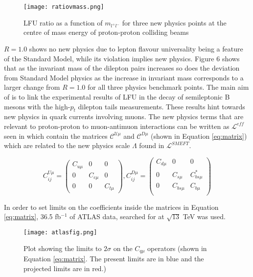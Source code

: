 \documentclass[11pt,oneside,a4paper]{article}
\begin{document}
\begin{figure}[htbp]
	\centering
	\texttt{[image: ratiovmass.png]}
	\caption{LFU ratio as a function of $m_{l^{+}l^{-}}$ for three new physics points at the centre of mass energy of proton-proton colliding beams}
	\label{fig:ratiovmass}
\end{figure}
$R = 1.0$ shows no new physics due to lepton flavour universality being a feature of the Standard Model, while its violation implies new physics. Figure 6 shows that as the invariant mass of the dilepton pairs increases so does the deviation from Standard Model physics as the increase in invariant mass corresponds to a larger change from $R = 1.0$ for all three physics benchmark points. The main aim of \cite{highptdilepton} is to link the experimental results of LFU in the decay of semileptonic B mesons with the high-$p_{t}$ dilepton tails measurements. These results hint towards new physics in quark currents involving muons. The new physics terms that are relevant to proton-proton to muon-antimuon interactions can be written as $\mathcal{L}^{eff}$ seen in \cite{highptdilepton} which contain the matrices $\mathcal{C^{U\mu}}$ and $\mathcal{C}^{D\mu}$ (shown in Equation \ref{eq:matrix}) which are related to the new physics scale $\Lambda$ found in $\mathcal{L}^{SMEFT}$. 



\begin{equation}
\label{eq:matrix}
C^{U\mu}_{ij} =
 \left( \begin{array}{ccc} 
C_{u\mu} & 0 & 0 \\
0 & C_{c\mu}& 0\\
0 & 0 & C_{t\mu}
\end{array} \right)
,
%
C^{D\mu}_{ij} =
\left( \begin{array}{ccc}
C_{d\mu} & 0 & 0 \\
0 &  C_{s\mu} & C^{*}_{bs\mu}\\
0 &  C_{bs\mu}& C_{b\mu}\\
\end{array} \right)
\end{equation}

In order to set limits on the coefficients inside the matrices in Equation \ref{eq:matrix}, 36.5 fb$^{-1}$ of ATLAS data, searched for at  $\sqrt{13}$ TeV was used.

\begin{figure}[htbp]
	\centering
	\texttt{[image: atlasfig.png]}
	\caption{Plot showing the limits to $2\sigma$ on the $C_{q\mu}$ operators (shown in Equation \ref{eq:matrix}. The present limits are in blue and the projected limits are in red.)}
	\label{fig:atlasfig}
\end{figure}
\end{document}
